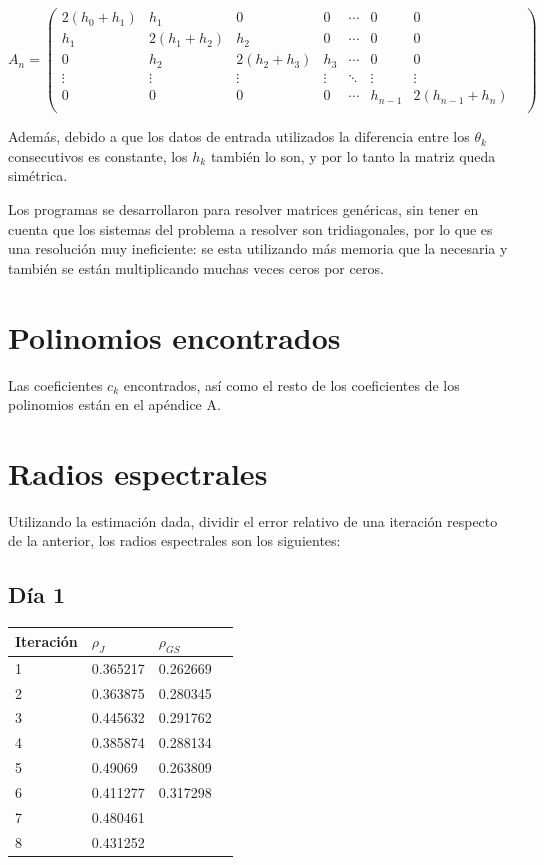 \documentclass[12pt,spanish]{article}
\begin{document}
\[
A_n=
  \begin{pmatrix}
   2(h_0+h_1) & h_1 & 0 &  0 & \cdots & 0 & 0 &\\
   h_1 & 2(h_1+h_2) & h_2 & 0 &  \cdots & 0 & 0 &\\
   0 & h_2 & 2(h_2+h_3) & h_3  &  \cdots & 0 & 0 &\\
   \vdots  & \vdots & \vdots & \vdots & \ddots & \vdots & \vdots &\\
   0 & 0 & 0 & 0 & \cdots & h_{n-1} & 2(h_{n-1}+h_n)\\
  \end{pmatrix}
\]

Además, debido a que los datos de entrada utilizados la diferencia entre los $\theta _k$ consecutivos es constante, los $h_k$ también lo son, y por lo tanto la matriz queda simétrica.

Los programas se desarrollaron para resolver matrices genéricas, sin tener en cuenta que los sistemas del problema a resolver son tridiagonales, por lo que es una resolución muy ineficiente: se esta utilizando más memoria que la necesaria y también se están multiplicando muchas veces ceros por ceros.

\section*{Polinomios encontrados}
Las coeficientes $c_k$ encontrados, así como el resto de los coeficientes de los polinomios están en el apéndice A.
\section*{Radios espectrales}
Utilizando la estimación dada, dividir el error relativo de una iteración respecto de la anterior, los radios espectrales son los siguientes:

\subsection*{Día 1}
    \begin{tabular}{| l | l | l | l |}
    \hline
    Iteración & $\rho_J$ & $\rho_{GS}$ \\ \hline
1 & 0.365217 & 0.262669 \\
2 & 0.363875 & 0.280345 \\
3 & 0.445632 & 0.291762 \\
4 & 0.385874 & 0.288134 \\
5 & 0.49069 & 0.263809 \\
6 & 0.411277 & 0.317298 \\
7 & 0.480461 &  \\
8 & 0.431252 & \\ 
    \hline
    \end{tabular}
\end{document}
